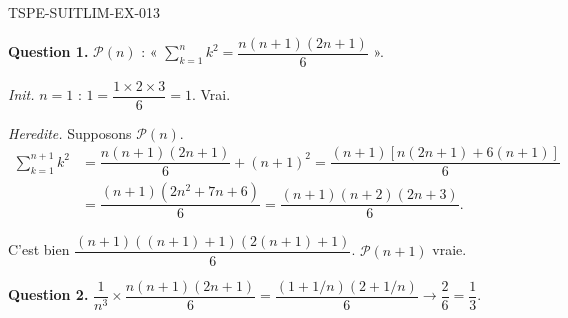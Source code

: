 \begin{corrige}{TSPE-SUITLIM-EX-013}

\textbf{Question 1.} $\mathcal{P}(n)$ : « $\sum_{k=1}^{n} k^2 = \dfrac{n(n+1)(2n+1)}{6}$ ».

\textit{Init.} $n=1$ : $1 = \dfrac{1 \times 2 \times 3}{6} = 1$. Vrai.

\textit{Heredite.} Supposons $\mathcal{P}(n)$.
\begin{align*}
  \sum_{k=1}^{n+1} k^2
    &= \dfrac{n(n+1)(2n+1)}{6} + (n+1)^2
     = \dfrac{(n+1)\left[n(2n+1)+6(n+1)\right]}{6} \\
    &= \dfrac{(n+1)(2n^2+7n+6)}{6}
     = \dfrac{(n+1)(n+2)(2n+3)}{6}.
\end{align*}

C'est bien $\dfrac{(n+1)((n+1)+1)(2(n+1)+1)}{6}$. $\mathcal{P}(n+1)$ vraie.

\textbf{Question 2.} $\dfrac{1}{n^3} \times \dfrac{n(n+1)(2n+1)}{6} = \dfrac{(1+1/n)(2+1/n)}{6} \to \dfrac{2}{6} = \boxed{\dfrac{1}{3}}$.

\end{corrige}
